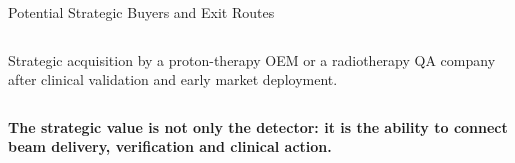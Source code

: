 \documentclass[aspectratio=169,11pt]{beamer}
\begin{document}
\begin{frame}{Potential Strategic Buyers and Exit Routes}
\begin{columns}[T,onlytextwidth]
\vspace{0.10cm}

\tiny\color{black}

Strategic acquisition by a proton-therapy OEM or a radiotherapy
QA company after clinical validation and early market deployment.

\end{columns}

\vspace{0.30cm}

\begin{center}
\small\bfseries\color{darkred}
The strategic value is not only the detector:
it is the ability to connect beam delivery, verification and clinical action.
\end{center}

\end{frame}
\end{document}
